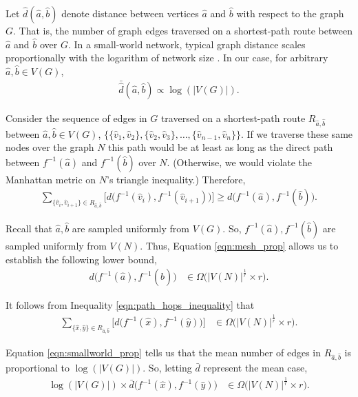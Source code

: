 Let $\hat{d}(\hat{a},\hat{b})$ denote distance between vertices $\hat{a}$ and $\hat{b}$ with respect to the graph $G$.
That is, the number of graph edges traversed on a shortest-path route between $\hat{a}$ and $\hat{b}$ over $G$.
In a small-world network, typical graph distance scales proportionally with the logarithm of network size \citep{watts1998collective}.
In our case, for arbitrary $\hat{a},\hat{b} \in V(G)$,
\begin{align} \label{eqn:smallworld_prop}
\bar{\hat{d}}(\hat{a},\hat{b}) \propto \log(|V(G)|).
\end{align}

Consider the sequence of edges in $G$ traversed on a shortest-path route $R_{\hat{a},\hat{b}}$ between $\hat{a}, \hat{b} \in V(G)$, $\{\{\hat{v}_1, \hat{v}_2\}, \{\hat{v}_2, \hat{v}_3\}, \ldots, \{\hat{v}_{n-1}, \hat{v}_n\} \}$.
If we traverse these same nodes over the graph $N$ this path would be at least as long as the direct path between $f^{-1}(\hat{a})$ and $f^{-1}(\hat{b})$ over $N$.
(Otherwise, we would violate the Manhattan metric on $N$'s triangle inequality.)
Therefore,
\begin{align} \label{eqn:path_hops_inequality}
\sum_{\{\hat{v}_i, \hat{v}_{i+1}\} \in  R_{\hat{a},\hat{b}}}
\Big[ d\Big(f^{-1}(\hat{v}_i), f^{-1}(\hat{v}_{i+1})\Big) \Big]
\geq
d\Big(f^{-1}(\hat{a}), f^{-1}(\hat{b})\Big).
\end{align}

Recall that $\hat{a},\hat{b}$ are sampled uniformly from $V(G)$.
So, $f^{-1}(\hat{a}),f^{-1}(\hat{b})$ are sampled uniformly from $V(N)$.
Thus, Equation \ref{eqn:mesh_prop} allows us to establish the following lower bound,
\begin{align*}
d\Big(f^{-1}(\hat{a}), f^{-1}(\hat{b})\Big)
&\in
\Omega \Big(
  |V(N)|^{\frac{1}{r}} \times r
\Big).
\end{align*}

It follows from Inequality \ref{eqn:path_hops_inequality} that
\begin{align*}
\sum_{\{\hat{x}, \hat{y}\} \in  R_{\hat{a},\hat{b}}}
\Big[ d\Big(f^{-1}(\hat{x}), f^{-1}(\hat{y})\Big) \Big]
&\in
\Omega \Big(
  |V(N)|^{\frac{1}{r}} \times r
\Big).
\end{align*}

Equation \ref{eqn:smallworld_prop} tells us that the mean number of edges in $R_{\hat{a}, \hat{b}}$ is proportional to $\log(|V(G)|)$.
So, letting $\bar{d}$ represent the mean case,
\begin{align*}
\log(|V(G)|) \times \bar{d}\Big(f^{-1}(\hat{x}), f^{-1}(\hat{y})\Big)
&\in
\Omega \Big(
  |V(N)|^{\frac{1}{r}} \times r
\Big).
\end{align*}

